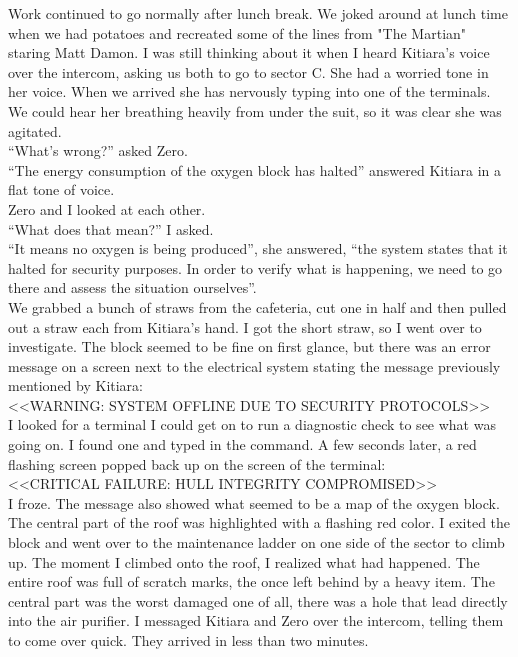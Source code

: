 \documentclass[a4paper,onecolumn,11pt]{article}
\begin{document}
Work continued to go normally after lunch break. We joked around at lunch time when we had potatoes and recreated some of the lines from "The Martian" staring Matt Damon. I was still thinking about it when I heard Kitiara's voice over the intercom, asking us both to go to sector C. She had a worried tone in her voice. When we arrived she has nervously typing into one of the terminals. We could hear her breathing heavily from under the suit, so it was clear she was agitated.\\
\newline
``What's wrong?'' asked Zero.\\
``The energy consumption of the oxygen block has halted'' answered Kitiara in a flat tone of voice.\\
\newline
Zero and I looked at each other.\\
\newline
``What does that mean?'' I asked.\\
``It means no oxygen is being produced'', she answered, ``the system states that it halted for security purposes. In order to verify what is happening, we need to go there and assess the situation ourselves''.\\
\newline
We grabbed a bunch of straws from the cafeteria, cut one in half and then pulled out a straw each from Kitiara's hand. I got the short straw, so I went over to investigate. The block seemed to be fine on first glance, but there was an error message on a screen next to the electrical system stating the message previously mentioned by Kitiara:\\
\newline
<<\textsc{WARNING: SYSTEM OFFLINE DUE TO SECURITY PROTOCOLS}>>\\
\newline
I looked for a terminal I could get on to run a diagnostic check to see what was going on. I found one and typed in the command. A few seconds later, a red flashing screen popped back up on the screen of the terminal:\\
\newline
<<\textsc{CRITICAL FAILURE: HULL INTEGRITY COMPROMISED}>>\\
\newline
I froze. The message also showed what seemed to be a map of the oxygen block. The central part of the roof was highlighted with a flashing red color. I exited the block and went over to the maintenance ladder on one side of the sector to climb up. The moment I climbed onto the roof, I realized what had happened. The entire roof was full of scratch marks, the once left behind by a heavy item. The central part was the worst damaged one of all, there was a hole that lead directly into the air purifier. I messaged Kitiara and Zero over the intercom, telling them to come over quick. They arrived in less than two minutes.\\
\end{document}
